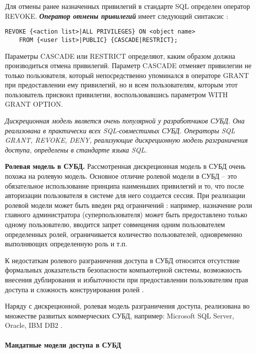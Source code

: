 {Для отмены ранее назначенных привилегий в стандарте SQL определен оператор REVOKE. \textit{\textbf{Оператор отмены 
привилегий}} имеет следующий синтаксис \autocite{Skakun}:
\begin{lstlisting}[]
REVOKE {<action list>|ALL PRIVILEGES} ON <object name>
    FROM {<user list>|PUBLIC} {CASCADE|RESTRICT};
\end{lstlisting}
Параметры CASCADE или RESTRICT определяют, каким образом должна производиться отмена привилегий. Параметр 
CASCADE отменяет привилегии не только пользователя, который непосредственно упоминался в операторе GRANT при 
предоставлении ему привилегий, но и всем пользователям, которым этот пользователь присвоил привилегии,
воспользовавшись параметром WITH GRANT OPTION.

\textit{Дискреционная модель является очень популярной у разработчиков СУБД. Она реализована в практически всех 
SQL-совместимых СУБД. Операторы SQL GRANT, REVOKE, DENY, реализующие дискреционную модель разграничения 
доступа, определены в стандарте языка SQL.}

\textbf{Ролевая модель в СУБД.} Рассмотренная дискреционная модель в СУБД очень похожа на ролевую модель. 
Основное отличие ролевой модели в СУБД -- это обязательное использование принципа наименьших привилегий 
и то, что после авторизации пользователя в системе для него создается сессия. При реализации ролевой 
модели может быть введен ряд ограничений \autocite{Skakun}: например, назначение роли главного администратора 
(суперпользователя) может быть предоставлено только одному пользователю, вводится запрет совмещения одним 
пользователем определенных ролей, ограничивается количество пользователей, одновременно выполняющих определенную 
роль и т.п.

К недостаткам ролевого разграничения доступа в СУБД относится отсутствие формальных доказательств безопасности 
компьютерной системы, возможность внесения дублирования и избыточности при предоставлении пользователям прав 
доступа и сложность конструирования ролей \autocite{Skakun}.

Наряду с дискреционной, ролевая модель разграничения доступа, реализована во множестве развитых коммерческих 
СУБД, например: Microsoft SQL Server, Oracle, IBM DB2 \autocite{Skakun}.

\paragraph{Мандатные модели доступа в СУБД}

}
